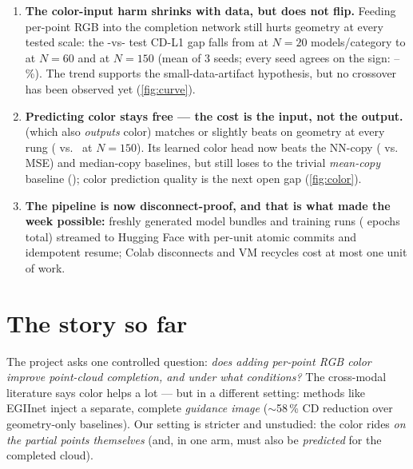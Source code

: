 \documentclass[11pt]{article}
\begin{document}
\reportheader

\begin{tldr}
\begin{enumerate}
  \item \textbf{The color-input harm shrinks with data, but does not flip.} Feeding
  per-point RGB into the completion network still hurts geometry at every tested scale:
  the -vs- test CD-L1 gap falls from \worse{\gapCtwenty} at
  $N{=}20$ models/category to \worse{\gapCsixty} at $N{=}60$ and \worse{\gapConefifty} at
  $N{=}150$ (mean of 3 seeds; every seed agrees on the sign:
  \gapCseedOne--\gapCseedThree\,\%). The trend supports the small-data-artifact
  hypothesis, but no crossover has been observed yet (\cref{fig:curve}).
  \item \textbf{Predicting color stays free --- the cost is the input, not the output.}
   (which also \emph{outputs} color) matches or slightly beats
   on geometry at every rung (\worse{\gapBonefifty} vs.\
  \worse{\gapConefifty} at $N{=}150$). Its learned color head now beats the NN-copy
  (\cmseBonefifty{} vs.\ \cmseNN{} MSE) and median-copy baselines, but still loses to the
  trivial \emph{mean-copy} baseline (\cmseMean); color prediction quality is the next
  open gap (\cref{fig:color}).
  \item \textbf{The pipeline is now disconnect-proof, and that is what made the week
  possible:} \nBundles{} freshly generated model bundles and \nRuns{} training runs
  (\totalEpochs{} epochs total) streamed to Hugging Face with per-unit atomic commits and
  idempotent resume; Colab disconnects and VM recycles cost at most one unit of work.
\end{enumerate}
\end{tldr}

\section{The story so far}\label{sec:story}

The project asks one controlled question: \emph{does adding per-point RGB color improve
point-cloud completion, and under what conditions?} The cross-modal literature says color
helps a lot --- but in a different setting: methods like EGIInet inject a separate,
complete \emph{guidance image} ($\sim$58\,\% CD reduction over geometry-only baselines).
Our setting is stricter and unstudied: the color rides \emph{on the partial points
themselves} (and, in one arm, must also be \emph{predicted} for the completed cloud).
\end{document}
